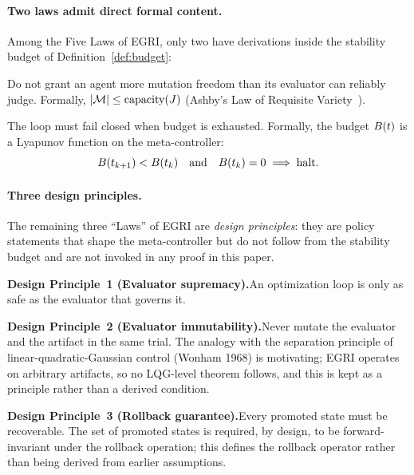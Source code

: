 \documentclass[11pt,a4paper]{article}
\begin{document}
\paragraph{Two laws admit direct formal content.}
Among the Five Laws of EGRI, only two have derivations inside the
stability budget of Definition~\ref{def:budget}:

\begin{law}
\label{law:capacity}
Do not grant an agent more mutation freedom than its evaluator can
reliably judge.  Formally, $\left| \mathcal{M} \right| \leq \text{capacity}(J)$
(Ashby's Law of Requisite
Variety~\cite{ashby1956introduction}).
\end{law}

\begin{law}
\label{law:budget}
The loop must fail closed when budget is exhausted.  Formally, the
budget $B(t)$ is a Lyapunov function on the meta-controller:
\begin{equation}
  B(t_{k+1}) < B(t_k)
  \quad \text{and} \quad
  B(t_k) = 0 \implies \text{halt}.
\end{equation}
\end{law}

\paragraph{Three design principles.}
The remaining three ``Laws'' of EGRI are \emph{design principles}: they
are policy statements that shape the meta-controller but do not follow
from the stability budget and are not invoked in any proof in this
paper.

\textbf{Design Principle~1 (Evaluator supremacy).}\quad An optimization
loop is only as safe as the evaluator that governs it.

\textbf{Design Principle~2 (Evaluator immutability).}\quad Never mutate
the evaluator and the artifact in the same trial.  The analogy with the
separation principle of linear-quadratic-Gaussian control
(Wonham 1968) is motivating; EGRI operates on arbitrary artifacts, so
no LQG-level theorem follows, and this is kept as a principle rather
than a derived condition.

\textbf{Design Principle~3 (Rollback guarantee).}\quad Every promoted
state must be recoverable.  The set of promoted states is required, by
design, to be forward-invariant under the rollback operation; this
defines the rollback operator rather than being derived from earlier
assumptions.
\end{document}
